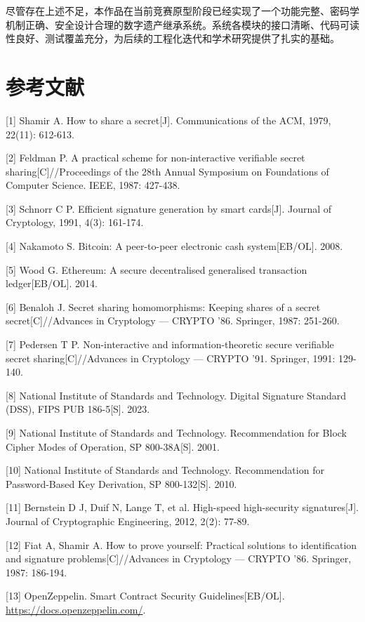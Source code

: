 \documentclass[UTF8,a4paper,zihao=-4,openany]{ctexrep}
\begin{document}
尽管存在上述不足，本作品在当前竞赛原型阶段已经实现了一个功能完整、密码学机制正确、安全设计合理的数字遗产继承系统。系统各模块的接口清晰、代码可读性良好、测试覆盖充分，为后续的工程化迭代和学术研究提供了扎实的基础。

\chapter*{参考文献}

[1] Shamir A. How to share a secret[J]. Communications of the ACM, 1979, 22(11): 612-613.

[2] Feldman P. A practical scheme for non-interactive verifiable secret sharing[C]//Proceedings of the 28th Annual Symposium on Foundations of Computer Science. IEEE, 1987: 427-438.

[3] Schnorr C P. Efficient signature generation by smart cards[J]. Journal of Cryptology, 1991, 4(3): 161-174.

[4] Nakamoto S. Bitcoin: A peer-to-peer electronic cash system[EB/OL]. 2008.

[5] Wood G. Ethereum: A secure decentralised generalised transaction ledger[EB/OL]. 2014.

[6] Benaloh J. Secret sharing homomorphisms: Keeping shares of a secret secret[C]//Advances in Cryptology — CRYPTO '86. Springer, 1987: 251-260.

[7] Pedersen T P. Non-interactive and information-theoretic secure verifiable secret sharing[C]//Advances in Cryptology — CRYPTO '91. Springer, 1991: 129-140.

[8] National Institute of Standards and Technology. Digital Signature Standard (DSS), FIPS PUB 186-5[S]. 2023.

[9] National Institute of Standards and Technology. Recommendation for Block Cipher Modes of Operation, SP 800-38A[S]. 2001.

[10] National Institute of Standards and Technology. Recommendation for Password-Based Key Derivation, SP 800-132[S]. 2010.

[11] Bernstein D J, Duif N, Lange T, et al. High-speed high-security signatures[J]. Journal of Cryptographic Engineering, 2012, 2(2): 77-89.

[12] Fiat A, Shamir A. How to prove yourself: Practical solutions to identification and signature problems[C]//Advances in Cryptology — CRYPTO '86. Springer, 1987: 186-194.

[13] OpenZeppelin. Smart Contract Security Guidelines[EB/OL]. \url{https://docs.openzeppelin.com/}.
\end{document}
